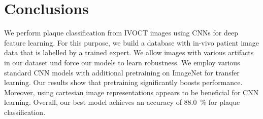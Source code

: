 \section{Conclusions}

We perform plaque classification from IVOCT images using CNNs for deep feature learning. For this purpose, we build a database with in-vivo patient image data that is labelled by a trained expert. We allow images with various artifacts in our dataset und force our models to learn robustness. We employ various standard CNN models with additional pretraining on ImageNet for transfer learning. Our results show that pretraining significantly boosts performance. Moreover, using cartesian image representations appears to be beneficial for CNN learning. Overall, our best model achieves an accuracy of \SI{88.0}{\percent} for plaque classification.







